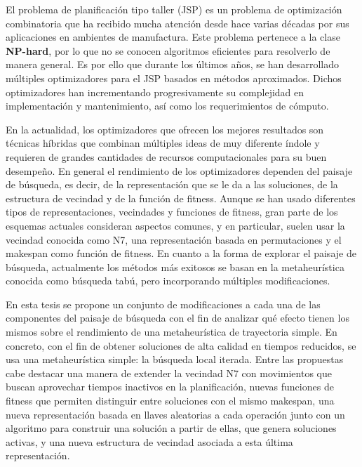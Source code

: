 El problema de planificación tipo taller (JSP) es un problema de optimización combinatoria que ha recibido mucha atención desde hace varias décadas por sus aplicaciones 
en ambientes de manufactura. 
%
Este problema pertenece a la clase \textbf{NP-hard}, por lo que no se conocen algoritmos eficientes para resolverlo de manera general.
%
Es por ello que durante los últimos años, se han desarrollado múltiples optimizadores para el JSP basados en métodos aproximados. 
%
Dichos optimizadores han incrementando progresivamente su complejidad en implementación y mantenimiento, así como los requerimientos
de cómputo.

En la actualidad, los optimizadores que ofrecen los mejores resultados son técnicas híbridas que combinan múltiples ideas de muy diferente índole 
y requieren de grandes cantidades de recursos computacionales para su buen desempeño. 
%
En general el rendimiento de los optimizadores dependen del paisaje de búsqueda, es decir, de la representación que se le da a las soluciones, de la estructura de vecindad 
y de la función de fitness. 
%
Aunque se han usado diferentes tipos de representaciones, vecindades y funciones de fitness, gran parte de los esquemas actuales consideran aspectos comunes, y en particular, 
suelen usar la vecindad conocida como N7, una representación basada en permutaciones y el makespan como función de fitness. 
%
En cuanto a la forma de explorar el paisaje de búsqueda, actualmente los métodos más exitosos se basan en la metaheurística conocida como búsqueda tabú, pero incorporando 
múltiples modificaciones.

En esta tesis se propone un conjunto de modificaciones a cada una de las componentes del paisaje de búsqueda con el fin de analizar qué efecto tienen 
los mismos sobre el rendimiento de una metaheurística de trayectoria simple. 
%
En concreto, con el fin de obtener soluciones de alta calidad en tiempos reducidos, se usa una metaheurística simple: la búsqueda local iterada.
%
Entre las propuestas cabe destacar una manera de extender la vecindad N7 con movimientos que buscan aprovechar tiempos inactivos en la planificación,
nuevas funciones de fitness que permiten distinguir entre soluciones con el mismo makespan, una nueva representación basada en
llaves aleatorias a cada operación junto con un algoritmo para construir una solución a partir de ellas, que genera soluciones activas, y
una nueva estructura de vecindad asociada a esta última representación. 

